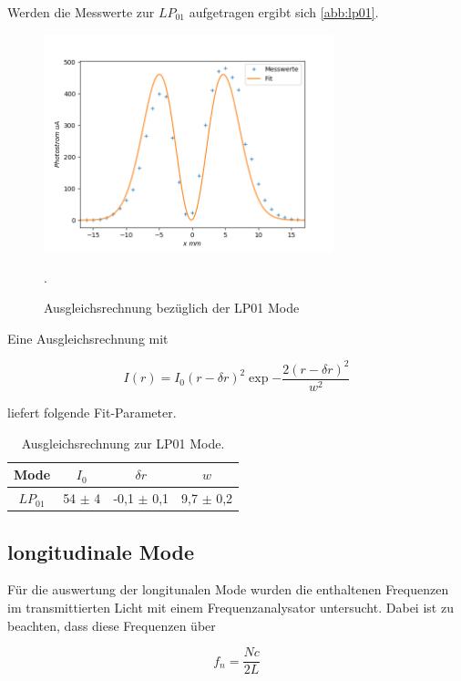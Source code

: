 Werden die Messwerte zur $LP_{01}$ aufgetragen ergibt sich \autoref{abb:lp01}.

\begin{figure}[h]
  \centering
  \includegraphics[width=0.75\textwidth]{img/lp01.png}
  \caption{Ausgleichsrechnung bezüglich der LP01 Mode}.
  \label{abb:lp01}
\end{figure}

Eine Ausgleichsrechnung mit

\begin{equation}
I(r) = I_0 (r - \delta r)^{2} \exp{- \frac{2 (r - \delta r)^2}{w^2}}
\end{equation}

liefert folgende Fit-Parameter.

\begin{table}[h]
	\label{tab:lp01}
	\centering
	\begin{tabular}{cccc}
  Mode & $I_0$ & $\delta r$ & $w$ \\
  \hline
  $LP_{01}$ & 54 $\pm$ 4 & -0,1 $\pm$ 0,1 & 9,7 $\pm$ 0,2 \\
	\end{tabular}
  \caption{Ausgleichsrechnung zur LP01 Mode.}
\end{table}

\clearpage

\subsection{longitudinale Mode}

Für die auswertung der longitunalen Mode wurden die enthaltenen Frequenzen im transmittierten Licht mit
einem Frequenzanalysator untersucht. Dabei ist zu beachten, dass diese Frequenzen über

\begin{equation}
f_n = \frac{Nc}{2L}
\end{equation}

